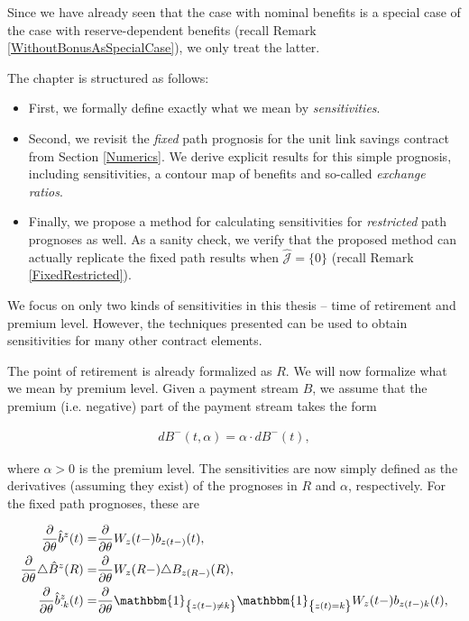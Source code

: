 \documentclass{article}
\newcommand{\1}[1]{\mathbbm{1}_{\left\lbrace #1 \right\rbrace}}
\theoremstyle{break}
\theoremstyle{remark}
\numberwithin{equation}{section}
\begin{document}
Since we have already seen that the case with nominal benefits is a special case of the case with reserve-dependent benefits (recall Remark \ref{WithoutBonusAsSpecialCase}), we only treat the latter.

The chapter is structured as follows:

\begin{itemize}
	\item First, we formally define exactly what we mean by \textit{sensitivities}.
	\item Second, we revisit the \textit{fixed} path prognosis for the unit link savings contract from Section \ref{Numerics}. We derive explicit results for this simple prognosis, including sensitivities, a contour map of benefits and so-called \textit{exchange ratios}.
	\item Finally, we propose a method for calculating sensitivities for \textit{restricted} path prognoses as well. As a sanity check, we verify that the proposed method can actually replicate the fixed path results when $\hat{\mathcal{J}} = \{0\}$ (recall Remark \ref{FixedRestricted}).
\end{itemize}

\bigbreak
\bigbreak
\bigbreak

We focus on only two kinds of sensitivities in this thesis -- time of retirement and premium level. However, the techniques presented can be used to obtain sensitivities for many other contract elements.

The point of retirement is already formalized as $R$. We will now formalize what we mean by premium level. Given a payment stream $B$, we assume that the premium (i.e. negative) part of the payment stream takes the form

\begin{align} \label{PremLvl}
	dB^-(t, \alpha) = \alpha \cdot dB^-(t),
\end{align}

where $\alpha>0$ is the premium level. The sensitivities are now simply defined as the derivatives (assuming they exist) of the prognoses in $R$ and $\alpha$, respectively. For the fixed path prognoses, these are

\begin{align*}
	\frac{\partial}{\partial \theta} \hat{b}^{z}(t) =& \frac{\partial}{\partial \theta} W_z(t-)b_{z(t-)}(t) , \\
	\frac{\partial}{\partial \theta} \triangle \hat{B}^{z}(R) =& \frac{\partial}{\partial \theta} W_z(R-)\triangle B_{z(R-)}(R) , \\
	\frac{\partial}{\partial \theta} \hat{b}_{\cdot k}^{z}(t) =& \frac{\partial}{\partial \theta} \1{z(t-) \neq k} \1{z(t) = k} W_z(t-) b_{z(t-) k}(t),
\end{align*}
\end{document}
